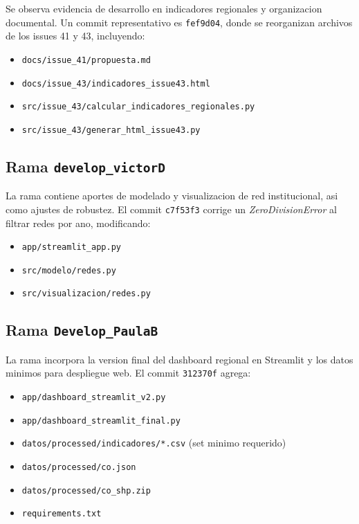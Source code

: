 \documentclass[12pt,letterpaper]{article}
\begin{document}
Se observa evidencia de desarrollo en indicadores regionales y organizacion documental. Un commit representativo es \texttt{fef9d04}, donde se reorganizan archivos de los issues 41 y 43, incluyendo:

\begin{itemize}
    \item \texttt{docs/issue\_41/propuesta.md}
    \item \texttt{docs/issue\_43/indicadores\_issue43.html}
    \item \texttt{src/issue\_43/calcular\_indicadores\_regionales.py}
    \item \texttt{src/issue\_43/generar\_html\_issue43.py}
\end{itemize}

\subsection{Rama \texttt{develop\_victorD}}

La rama contiene aportes de modelado y visualizacion de red institucional, asi como ajustes de robustez. El commit \texttt{c7f53f3} corrige un \textit{ZeroDivisionError} al filtrar redes por ano, modificando:

\begin{itemize}
    \item \texttt{app/streamlit\_app.py}
    \item \texttt{src/modelo/redes.py}
    \item \texttt{src/visualizacion/redes.py}
\end{itemize}

\subsection{Rama \texttt{Develop\_PaulaB}}

La rama incorpora la version final del dashboard regional en Streamlit y los datos minimos para despliegue web. El commit \texttt{312370f} agrega:

\begin{itemize}
    \item \texttt{app/dashboard\_streamlit\_v2.py}
    \item \texttt{app/dashboard\_streamlit\_final.py}
    \item \texttt{datos/processed/indicadores/*.csv} (set minimo requerido)
    \item \texttt{datos/processed/co.json}
    \item \texttt{datos/processed/co\_shp.zip}
    \item \texttt{requirements.txt}
\end{itemize}
\end{document}
